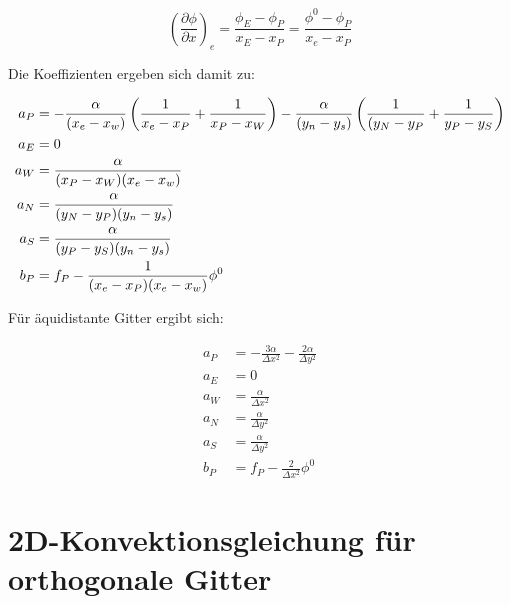 \documentclass[10pt, ngerman,colorback,accentcolor=tud2d]{tudreport}
\begin{document}
\begin{equation}
  \left({\frac{\partial \phi}{\partial x}}\right)_e =
  \frac{\phi_E-\phi_P}{x_E-x_P} = \frac{\phi^0-\phi_P}{x_e-x_P}
\end{equation}

Die Koeffizienten ergeben sich damit zu:

\begin{align*}
  a_P &= -\frac{\alpha}{(x_e-x_w)} \left({\frac{1}{x_e-x_P} + \frac{1}{x_P-x_W}}\right)
  -\frac{\alpha}{(y_n-y_s)} \left({\frac{1}{(y_N-y_P} + \frac{1}{y_P-y_S}}\right)\\
  a_E &= 0 \\
  a_W &= \frac{\alpha}{(x_P-x_W)(x_e-x_w)} \\
  a_N &= \frac{\alpha}{(y_N-y_P)(y_n-y_s)} \\
  a_S &= \frac{\alpha}{(y_P-y_S)(y_n-y_s)} \\
  b_P &=f_P- \frac{1}{(x_e-x_P)(x_e-x_w)} \phi^0
\end{align*}

Für äquidistante Gitter ergibt sich:

\begin{align*}
  a_P &= -\frac{3 \alpha}{\Delta x^2} -\frac{2 \alpha}{\Delta y^2}\\
  a_E &= 0 \\
  a_W &= \frac{\alpha}{\Delta x^2} \\
  a_N &= \frac{\alpha}{\Delta y^2} \\
  a_S &= \frac{\alpha}{\Delta y^2} \\
  b_P &=f_P-\frac{2}{\Delta x^2} \phi^0
\end{align*}


\chapter{2D-Konvektionsgleichung für orthogonale Gitter}
\end{document}
